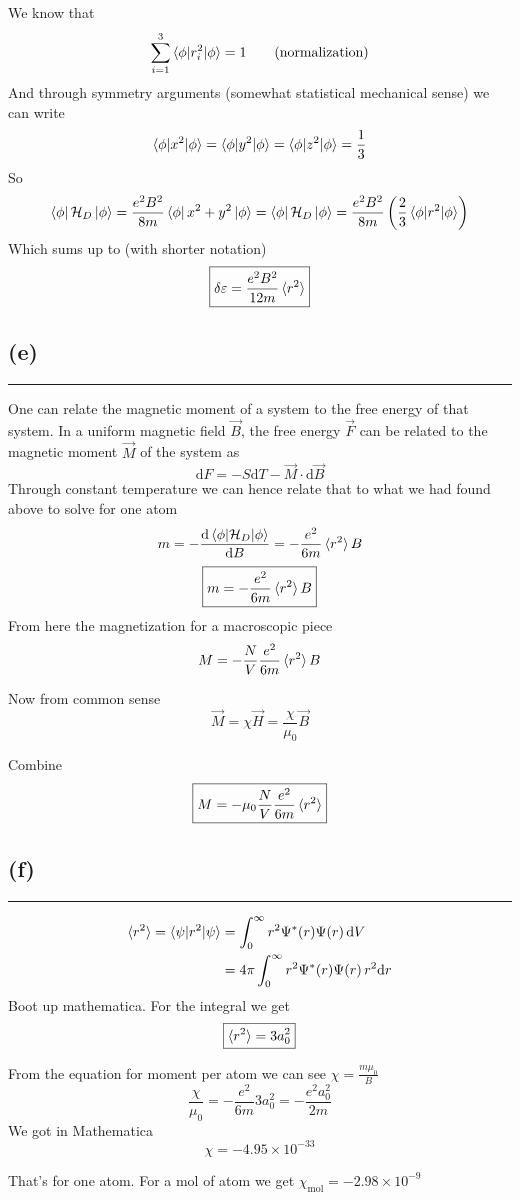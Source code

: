 \documentclass[letter, 10pts]{article}
\begin{document}
We know that 
\[ \sum_{i = 1}^{3} 
	\braket{\phi | r_i ^2 | \phi} =  1 \tag{normalization}
\]
And through symmetry arguments (somewhat statistical mechanical sense) we can write
\[
\braket{\phi | x^2 | \phi } = \braket{\phi  | y^2 | \phi} = \braket{\phi | z^2 | \phi} = \frac{1}{3}
\] 
So 
\[ \bra{\phi}
\mathcal H_D \ket{\phi} = \frac{e^2 B^2}{8 m } \bra{\phi} x^2 + y^2 \ket{\phi}
= \bra{\phi}
\mathcal H_D \ket{\phi} = \frac{e^2 B^2}{8 m } \left(\frac{2}{3} \braket{\phi | r^2 |\phi }\right)
\]
Which sums up to (with shorter notation) 
\[ \boxed{
\delta \varepsilon=
\frac{e^2 B^2}{12m} \braket{r^2 }
}\] 

\subsection*{(e)}
\hrule 
One can relate the magnetic moment of a system to the free energy of that system. In a uniform magnetic field $\vec{B}$, the free energy $\vec{F}$ can be related to the magnetic moment $\vec{M}$ of the system as
\[
\mathrm{d} F = - S \mathrm{d} T - \vec{M} \cdot  \mathrm{d} \vec{B} 
\] 
Through constant temperature we can hence relate that to what we had found above to solve for one atom
\[
m = -\frac{\mathrm{d} \braket{\phi | \mathcal H_D | \phi}}{\mathrm{d} B} =
- \frac{e^2}{6m } \braket{ r^2} B
\] 
\[
\boxed{
m = 
- \frac{e^2}{6m } \braket{ r^2} B
}
\] 
From here the magnetization for a macroscopic piece 
\[
M = 
- \frac{N}{V} \frac{e^2}{6m } \braket{ r^2} B
\] 

Now from common sense 
\[
\vec{M} = \chi \vec{H} = \frac{\chi}{\mu_0} \vec{B} 
\] 
 
Combine 
\[
\boxed{
M = - \mu_0 \frac{N}{V} \frac{e^2}{6m} \braket{ r^2} 
}
\] 



\subsection*{(f)} 
\hrule 
\begin{align*}
	\braket{ r^2} = \braket{\psi | r^2 | \psi } &= 
\int_{0}^{\infty} r^2 \Psi^{*} (r) \Psi(r)   \, \mathrm{d} V \\ 
&= 4 \pi   
\int_{0}^{\infty} r^2 \Psi^{*} (r) \Psi(r)   \,r^2  \mathrm{d} r \\ 
\end{align*}
Boot up mathematica. For the integral we get
\[
\boxed{
\braket{ r^2} = 3 a_0^2
}
\] 

From the equation for moment per atom we can see $\chi = \frac{m \mu_0}{B}$
\[
\frac{\chi}{\mu_0} = 
- \frac{e^2}{6m } 3 a_0^2  = - \frac{e^2 a_0^2}{2 m} 
\]
We got in Mathematica
\[
\chi = - 4.95 \times 10^{-33}
\] 

That's for one atom. For a mol of atom we get $\chi_\text{mol} = -2.98 \times 10^{-9}$ 

\end{document}
